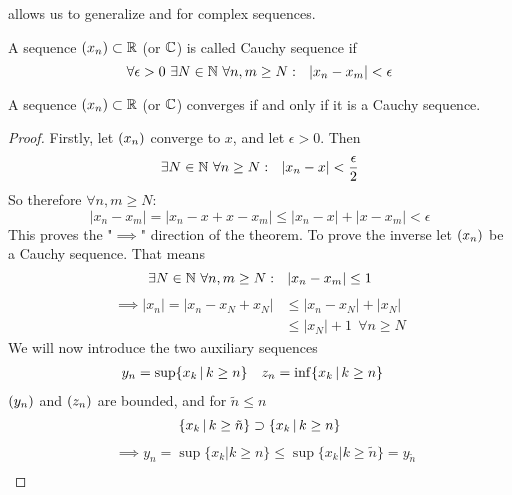 \documentclass[../../script.tex]{subfiles}
\begin{document}
\begin{rem}
 allows us to generalize  and  for complex sequences.
\end{rem}

\begin{defi}
A sequence $(x_n) \subset \mathbb{R}$ (or $\mathbb{C}$) is called Cauchy sequence if
\[
	\forall \epsilon > 0 ~\exists N \in \mathbb{N} ~\forall n, m \ge N: ~~|x_n - x_m| < \epsilon
\]
\end{defi}

\begin{thm}
A sequence $(x_n) \subset \mathbb{R}$ (or $\mathbb{C}$) converges if and only if it is a Cauchy sequence.
\end{thm}
\begin{proof}
Firstly, let $(x_n)$ converge to $x$, and let $\epsilon > 0$. Then
\begin{equation}
	\exists N \in \mathbb{N} ~\forall n \ge N: ~~|x_n - x| < \frac{\epsilon}{2}
\end{equation}
So therefore $\forall n, m \ge N$:
\begin{equation}
	|x_n - x_m| = |x_n -x + x - x_m| \le |x_n - x| + |x - x_m| < \epsilon
\end{equation}
This proves the "$\implies$" direction of the theorem. To prove the inverse let $(x_n)$ be a Cauchy sequence. That means
\begin{equation}
	\exists N \in \mathbb{N} ~\forall n, m \ge N: ~~|x_n - x_m| \le 1
\end{equation}
\begin{equation}
\begin{split}
	\implies |x_n| = |x_n - x_N + x_N| &\le |x_n - x_N| + |x_N| \\
	&\le |x_N| + 1 ~~\forall n \ge N
\end{split}
\end{equation}
We will now introduce the two auxiliary sequences
\begin{align}
	y_n &= \sup \{x_k \,\vert\, k \ge n \} & z_n &= \inf \{x_k \,\vert\, k \ge n \}
\end{align}
$(y_n)$ and $(z_n)$ are bounded, and for $\tilde{n} \le n$
\begin{equation}
	\{x_k \,\vert\, k \ge \tilde{n} \} \supset \{x_k \,\vert\, k \ge n \}
\end{equation}
\begin{align}
	&\implies y_n = \sup \{ x_k | k \ge n \} \le \sup \{ x_k | k \ge \tilde{n} \} = y_{\tilde{n}} \\

\end{align}
\end{proof}
\end{document}
